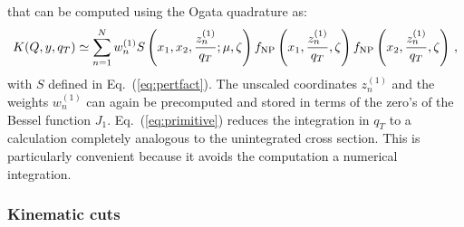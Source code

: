 \documentclass[10pt,a4paper]{article}
\begin{document}
that can be computed using the Ogata quadrature as:
\begin{equation}\label{eq:OgataPrimitive}
  K(Q,y,q_T) \simeq \sum_{n=1}^N w_n^{(1)} S\left(x_1,x_2,\frac{z_n^{(1)}}{q_T};\mu,\zeta\right) f_{\rm NP}\left(x_1,\frac{z_n^{(1)}}{q_T},\zeta\right) f_{\rm NP}\left(x_2,\frac{z_n^{(1)}}{q_T},\zeta\right)\,,
\end{equation}
with $S$ defined in Eq.~(\ref{eq:pertfact}). The unscaled coordinates
$z_n^{(1)}$ and the weights $w_n^{(1)}$ can again be precomputed and
stored in terms of the zero's of the Bessel function
$J_1$. Eq.~(\ref{eq:primitive}) reduces the integration in $q_T$ to a
calculation completely analogous to the unintegrated cross
section. This is particularly convenient because it avoids the
computation a numerical integration.

\subsubsection{Kinematic cuts}\label{sec:kincuts}
\end{document}
